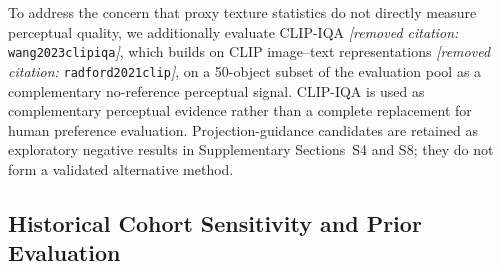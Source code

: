 \documentclass[times,twocolumn,final]{elsarticle}
\providecommand{\DIFadd}[1]{{\protect\color{blue} \sf #1}} %
\providecommand{\DIFdel}[1]{{\protect\color{red} \scriptsize #1}} %
\providecommand{\DIFaddbegin}{} %
\providecommand{\DIFaddend}{} %
\providecommand{\DIFdelbegin}{} %
\providecommand{\DIFdelend}{} %
\begin{document}
\DIFdelbegin %
\DIFdel{To address the concern that proxy texture statistics do not directly measure perceptual quality, we additionally evaluate CLIP-IQA \textit{[removed citation: }\texttt{wang2023clipiqa}\textit{]}, which builds on CLIP image--text representations \textit{[removed citation: }\texttt{radford2021clip}\textit{]}, on a 50-object subset of the evaluation pool as a complementary no-reference perceptual signal. CLIP-IQA is used as complementary perceptual evidence rather than a complete replacement for human preference evaluation.
}\DIFdelend \DIFaddbegin \DIFadd{Projection-guidance candidates are retained as exploratory negative results in Supplementary Sections~S4 and S8; they do not form a validated alternative method.
}\DIFaddend 

\DIFdelbegin %
\DIFdelend \DIFaddbegin \subsection{Historical Cohort Sensitivity and Prior Evaluation}
\label{subsec:original276}
\DIFaddend 
\end{document}
